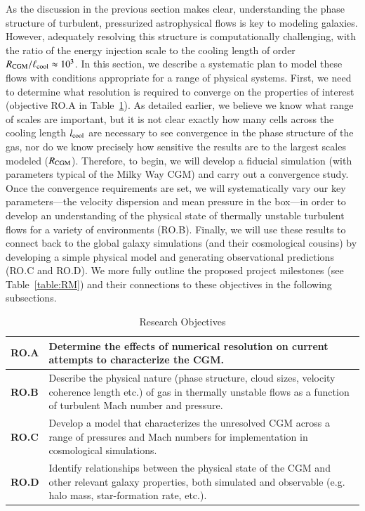 \documentclass[11pt,letterpaper,english]{article}
\begin{document}
As the discussion in the previous section makes clear, understanding the phase structure of turbulent, pressurized astrophysical flows is key to modeling galaxies. However, adequately resolving this structure is computationally challenging, with the ratio of the energy injection scale to the cooling length of order $R_{\rm CGM}/\ell_{\rm cool} \approx 10^3$.  In this section, we describe a systematic plan to model these flows with conditions appropriate for a range of physical systems. First, we need to determine what resolution is required to converge on the properties of interest (objective RO.A in Table~\ref{table:RO}).  As detailed earlier, we believe we know what range of scales are important, but it is not clear exactly how many cells across the cooling length $l_{\rm cool}$ are necessary to see convergence in the phase structure of the gas, nor do we know precisely how sensitive the results are to the largest scales modeled ($R_{\rm CGM}$).  Therefore, to begin, we will develop a fiducial simulation (with parameters typical of the Milky Way CGM) and carry out a convergence study.  Once the convergence requirements are set, we will systematically vary our key parameters---the velocity dispersion and mean pressure in the box---in order to develop an understanding of the physical state of thermally unstable turbulent flows for a variety of environments (RO.B). Finally, we will use these results to connect back to the global galaxy simulations (and their cosmological cousins) by developing a simple physical model and generating observational predictions (RO.C and RO.D). We more fully outline the proposed project milestones (see Table~\ref{table:RM}) and their connections to these objectives in the following subsections.


\begin{table}[h]
\caption{Research Objectives}
\label{table:RO}
\begin{tabular}{|l|p{5.8in}|}
\hline
\textbf{RO.A} & Determine the effects of numerical resolution on current attempts to characterize the CGM. \\ \hline
\textbf{RO.B} & Describe the physical nature (phase structure, cloud sizes, velocity coherence length etc.)
of gas in thermally unstable flows as a function of turbulent Mach number and pressure. \\ \hline
\textbf{RO.C} & Develop a model that characterizes the unresolved CGM across a range of
pressures and Mach numbers for implementation in cosmological simulations. \\ \hline
\textbf{RO.D} & Identify relationships between the physical state of the CGM and other relevant galaxy
properties, both simulated and observable (e.g. halo mass, star-formation rate, etc.). \\
\hline
\end{tabular}
\end{table}
\end{document}
